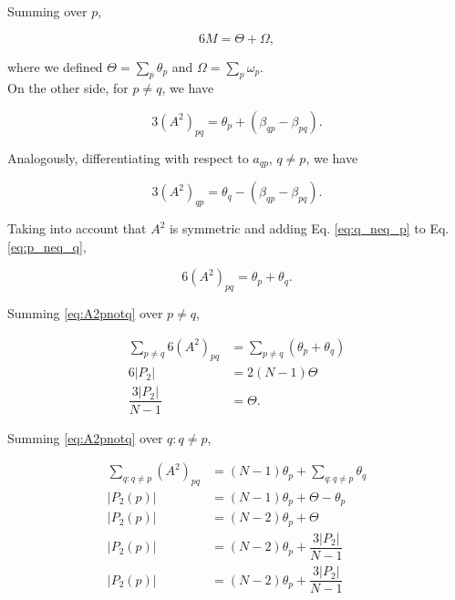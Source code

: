 \documentclass{article}
\begin{document}
Summing over $p$,

\begin{equation} \label{eq:diagonal}
    6 M = \Theta + \Omega,
\end{equation}

where we defined $\Theta = \sum_p \theta_p$ and $\Omega = \sum_p \omega_p$.
\\

On the other side, for $p\neq q$, we have

\begin{equation} \label{eq:p_neq_q}
    3 (A^2)_{pq} = \theta_p + (\beta_{qp} - \beta_{pq}).
\end{equation}

Analogously, differentiating with respect to $a_{qp}$, $q \neq p$, we have

\begin{equation}\label{eq:q_neq_p}
    3 (A^2)_{qp} = \theta_q - (\beta_{qp} - \beta_{pq}).
\end{equation}

Taking into account that $A^2$ is symmetric and adding Eq. \ref{eq:q_neq_p} to Eq. \ref{eq:p_neq_q}, 

\begin{equation} \label{eq:A2pnotq}
    6 (A^2)_{pq} = \theta_p + \theta_q.
\end{equation} 



Summing \ref{eq:A2pnotq} over $p\neq q$,

\begin{align}
    \sum_{p\neq q}6 (A^2)_{pq} &=\sum_{p\neq q} (\theta_p + \theta_q) \nonumber \\
    6 |P_2| &= 2(N-1) \Theta \nonumber \\
    \dfrac{3 |P_2|}{N-1} &= \Theta. \label{eq:sum_mu}
\end{align}

Summing \ref{eq:A2pnotq} over $q:q\neq p$,

\begin{align}
    \sum_{q:q\neq p} (A^2)_{pq} &= (N-1) \theta_p + \sum_{q:q\neq p} \theta_q \nonumber\\ 
    |P_2(p)| &= (N-1) \theta_p + \Theta - \theta_p \nonumber\\ 
    |P_2(p)| &= (N-2) \theta_p + \Theta \nonumber \\
    |P_2(p)| &= (N-2) \theta_p + \dfrac{3 |P_2|}{N-1} \nonumber \\
    |P_2(p)| &= (N-2) \theta_p + \dfrac{3 |P_2|}{N-1}
\end{align}
\end{document}

